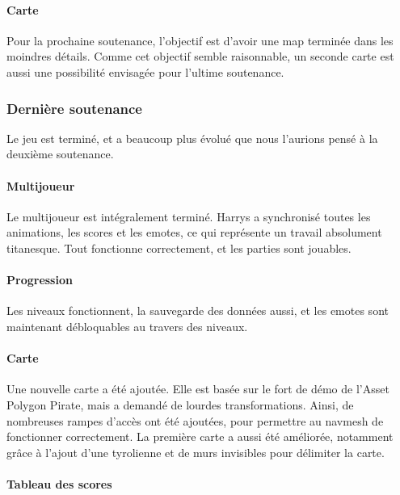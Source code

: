         \paragraph{Carte}

            Pour la prochaine soutenance, l'objectif est d'avoir une map terminée dans les moindres 
            détails. Comme cet objectif semble raisonnable, un seconde carte est aussi une possibilité 
            envisagée pour l'ultime soutenance.

    
    \subsubsection{Dernière soutenance}

        Le jeu est terminé, et a beaucoup plus évolué que nous l'aurions pensé à la deuxième soutenance.

        \paragraph{Multijoueur}

            Le multijoueur est intégralement terminé. Harrys a synchronisé toutes les animations, les scores et les emotes, ce qui représente 
            un travail absolument titanesque. Tout fonctionne correctement, et les parties sont jouables.

        
        \paragraph{Progression}

            Les niveaux fonctionnent, la sauvegarde des données aussi, et les emotes sont maintenant débloquables au travers des niveaux. 
        
        \paragraph{Carte}

            Une nouvelle carte a été ajoutée. Elle est basée sur le fort de démo de l'Asset Polygon Pirate, mais a demandé de lourdes transformations. 
            Ainsi, de nombreuses rampes d'accès ont été ajoutées, pour permettre au navmesh de fonctionner correctement. La première carte a aussi été améliorée, 
            notamment grâce à l'ajout d'une tyrolienne et de murs invisibles pour délimiter la carte.

        \paragraph{Tableau des scores}

